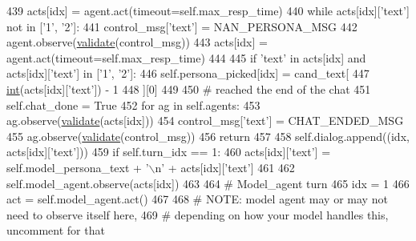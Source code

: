 \begin{DoxyCode}
439                         acts[idx] = agent.act(timeout=self.max\_resp\_time)
440                         \textcolor{keywordflow}{while} acts[idx][\textcolor{stringliteral}{'text'}] \textcolor{keywordflow}{not} \textcolor{keywordflow}{in} [\textcolor{stringliteral}{'1'}, \textcolor{stringliteral}{'2'}]:
441                             control\_msg[\textcolor{stringliteral}{'text'}] = NAN\_PERSONA\_MSG
442                             agent.observe(\hyperlink{namespaceparlai_1_1core_1_1worlds_afc3fad603b7bce41dbdc9cdc04a9c794}{validate}(control\_msg))
443                             acts[idx] = agent.act(timeout=self.max\_resp\_time)
444 
445                         \textcolor{keywordflow}{if} \textcolor{stringliteral}{'text'} \textcolor{keywordflow}{in} acts[idx] \textcolor{keywordflow}{and} acts[idx][\textcolor{stringliteral}{'text'}] \textcolor{keywordflow}{in} [\textcolor{stringliteral}{'1'}, \textcolor{stringliteral}{'2'}]:
446                             self.persona\_picked[idx] = cand\_text[
447                                 \hyperlink{namespacelanguage__model_1_1eval__ppl_a7d12ee00479673c5c8d1f6d01faa272a}{int}(acts[idx][\textcolor{stringliteral}{'text'}]) - 1
448                             ][0]
449 
450                     \textcolor{comment}{# reached the end of the chat}
451                     self.chat\_done = \textcolor{keyword}{True}
452                     \textcolor{keywordflow}{for} ag \textcolor{keywordflow}{in} self.agents:
453                         ag.observe(\hyperlink{namespaceparlai_1_1core_1_1worlds_afc3fad603b7bce41dbdc9cdc04a9c794}{validate}(acts[idx]))
454                         control\_msg[\textcolor{stringliteral}{'text'}] = CHAT\_ENDED\_MSG
455                         ag.observe(\hyperlink{namespaceparlai_1_1core_1_1worlds_afc3fad603b7bce41dbdc9cdc04a9c794}{validate}(control\_msg))
456                 \textcolor{keywordflow}{return}
457 
458             self.dialog.append((idx, acts[idx][\textcolor{stringliteral}{'text'}]))
459             \textcolor{keywordflow}{if} self.turn\_idx == 1:
460                 acts[idx][\textcolor{stringliteral}{'text'}] = self.model\_persona\_text + \textcolor{stringliteral}{'\(\backslash\)n'} + acts[idx][\textcolor{stringliteral}{'text'}]
461 
462             self.model\_agent.observe(acts[idx])
463 
464         \textcolor{comment}{# Model\_agent turn}
465         idx = 1
466         act = self.model\_agent.act()
467 
468         \textcolor{comment}{# NOTE: model agent may or may not need to observe itself here,}
469         \textcolor{comment}{# depending on how your model handles this, uncomment for that}

\end{DoxyCode}
